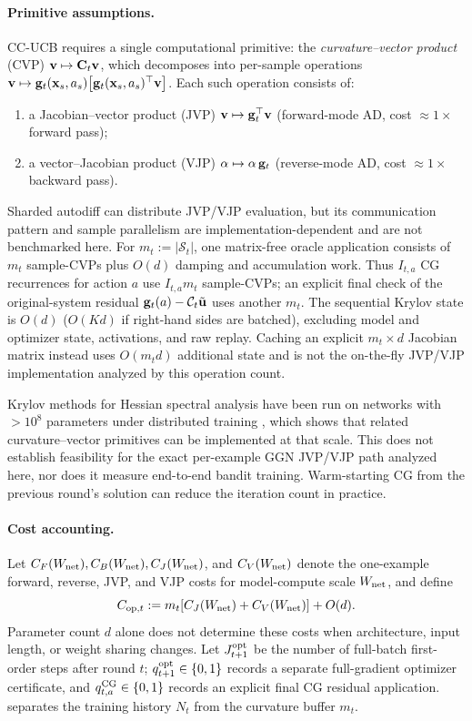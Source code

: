 \paragraph{Primitive assumptions.}
CC-UCB requires a single computational primitive: the
\emph{curvature--vector product} (CVP) $\mathbf{v}\mapsto\mathbf{C}_t\mathbf{v}$, which
decomposes into per-sample operations
$\mathbf{v}\mapsto\mathbf{g}_t(\mathbf{x}_s,a_s)\bigl[\mathbf{g}_t(\mathbf{x}_s,a_s)^\top\mathbf{v}\bigr]$.
Each such operation consists of:
\begin{enumerate}[nosep,leftmargin=1.5em]
\item a Jacobian--vector product (JVP) $\mathbf{v}\mapsto\mathbf{g}_t^\top\mathbf{v}$
  (forward-mode AD, cost $\approx 1\times$ forward pass);
\item a vector--Jacobian product (VJP) $\alpha\mapsto\alpha\,\mathbf{g}_t$
  (reverse-mode AD, cost $\approx 1\times$ backward pass).
\end{enumerate}
Sharded autodiff can distribute JVP/VJP evaluation, but its communication
pattern and sample parallelism are implementation-dependent and are not
benchmarked here.
For $m_t:=|\mathcal S_t|$, one matrix-free oracle application consists of
$m_t$ sample-CVPs plus $O(d)$ damping and accumulation work.  Thus
$I_{t,a}$ CG recurrences for action $a$ use $I_{t,a}m_t$ sample-CVPs; an
explicit final check of the original-system residual
$\mathbf{g}_t(a)-\mathcal{C}_t\tilde{\mathbf{u}}$ uses another $m_t$.  The sequential Krylov state
is $O(d)$ ($O(Kd)$ if right-hand sides are batched), excluding model and
optimizer state, activations, and raw replay.  Caching an explicit
$m_t\times d$ Jacobian matrix instead uses $O(m_td)$ additional state and is
not the on-the-fly JVP/VJP implementation analyzed by this operation count.

Krylov methods for Hessian spectral analysis have been run on networks with
$>10^8$ parameters under distributed training \citep{granziol2026hessian}, which
shows that related curvature--vector primitives can be implemented at that
scale.  This does not establish feasibility for the exact per-example GGN
JVP/VJP path analyzed here, nor does it measure end-to-end bandit training.
Warm-starting CG from the previous round's solution can reduce the
iteration count in practice.

\paragraph{Cost accounting.}
Let $C_F(W_{\rm net}),C_B(W_{\rm net}),C_J(W_{\rm net})$, and
$C_V(W_{\rm net})$ denote the one-example forward, reverse, JVP, and VJP
costs for model-compute scale $W_{\rm net}$, and define
\[
 C_{{\rm op},t}:=m_t[C_J(W_{\rm net})+C_V(W_{\rm net})]+O(d).
\]
Parameter count $d$ alone does not determine these costs when architecture,
input length, or weight sharing changes.  Let $J^{\rm opt}_{t+1}$ be the number
of full-batch first-order steps after round $t$;
$q^{\rm opt}_{t+1}\in\{0,1\}$ records a separate full-gradient optimizer
certificate, and $q^{\rm CG}_{t,a}\in\{0,1\}$ records an explicit final CG
residual application.   separates the training history $N_t$
from the curvature buffer $m_t$.

